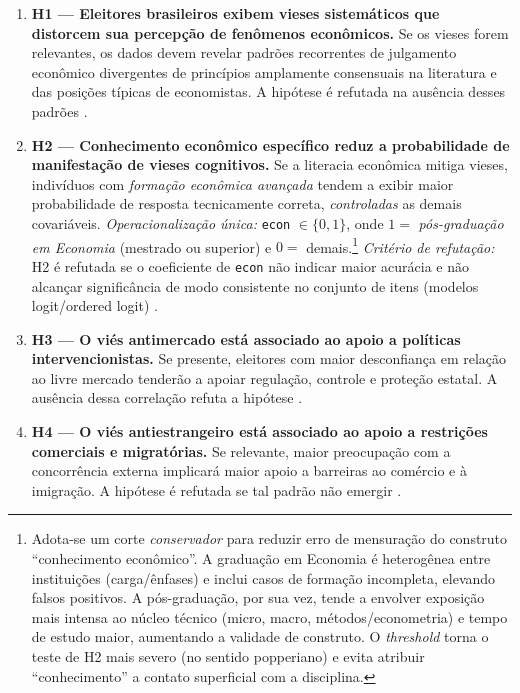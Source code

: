 \begin{enumerate}[label=\alph*)]

  \item \textbf{H1 — Eleitores brasileiros exibem vieses sistemáticos que distorcem sua percepção de fenômenos econômicos.} 
  Se os vieses forem relevantes, os dados devem revelar padrões recorrentes de julgamento econômico divergentes de princípios amplamente consensuais na literatura e das posições típicas de economistas. A hipótese é refutada na ausência desses padrões \cite{The_Myth_of_the_Rational_Voter,blendon1997}.

  \item \textbf{H2 — Conhecimento econômico específico reduz a probabilidade de manifestação de vieses cognitivos.} 
  Se a literacia econômica mitiga vieses, indivíduos com \emph{formação econômica avançada} tendem a exibir maior probabilidade de resposta tecnicamente correta, \emph{controladas} as demais covariáveis. 
  \textit{Operacionalização única:} \texttt{econ} $\in\{0,1\}$, onde $1 =$ \emph{pós-graduação em Economia} (mestrado ou superior) e $0 =$ demais.\footnote{Adota-se um corte \emph{conservador} para reduzir erro de mensuração do construto “conhecimento econômico”. A graduação em Economia é heterogênea entre instituições (carga/ênfases) e inclui casos de formação incompleta, elevando falsos positivos. A pós-graduação, por sua vez, tende a envolver exposição mais intensa ao núcleo técnico (micro, macro, métodos/econometria) e tempo de estudo maior, aumentando a validade de construto. O \emph{threshold} torna o teste de H2 mais severo (no sentido popperiano) e evita atribuir “conhecimento” a contato superficial com a disciplina.}
  \textit{Critério de refutação:} H2 é refutada se o coeficiente de \texttt{econ} não indicar maior acurácia e não alcançar significância de modo consistente no conjunto de itens (modelos logit/ordered logit) \cite{downs1957economic,Judgment_under_Uncertainty}.

  \item \textbf{H3 — O viés antimercado está associado ao apoio a políticas intervencionistas.}
  Se presente, eleitores com maior desconfiança em relação ao livre mercado tenderão a apoiar regulação, controle e proteção estatal. A ausência dessa correlação refuta a hipótese \cite{The_Myth_of_the_Rational_Voter,sowell2004applied}.

  \item \textbf{H4 — O viés antiestrangeiro está associado ao apoio a restrições comerciais e migratórias.}
  Se relevante, maior preocupação com a concorrência externa implicará maior apoio a barreiras ao comércio e à imigração. A hipótese é refutada se tal padrão não emergir \cite{The_Myth_of_the_Rational_Voter,bhagwati2003free}.


\end{enumerate}
